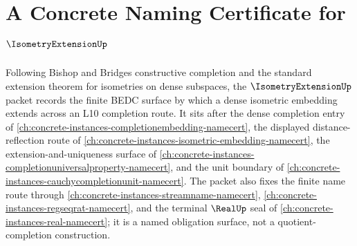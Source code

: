 \chapter{A Concrete Naming Certificate for $\IsometryExtensionUp$}
\label{ch:concrete-instances-isometryextension-namecert}

Following Bishop and Bridges constructive completion and the standard extension theorem for isometries on dense subspaces, the $\IsometryExtensionUp$ packet records the finite BEDC surface by which a dense isometric embedding extends across an L10 completion route. It sits after the dense completion entry of \autoref{ch:concrete-instances-completionembedding-namecert}, the displayed distance-reflection route of \autoref{ch:concrete-instances-isometric-embedding-namecert}, the extension-and-uniqueness surface of \autoref{ch:concrete-instances-completionuniversalproperty-namecert}, and the unit boundary of \autoref{ch:concrete-instances-cauchycompletionunit-namecert}. The packet also fixes the finite name route through \autoref{ch:concrete-instances-streamname-namecert}, \autoref{ch:concrete-instances-regseqrat-namecert}, and the terminal $\RealUp$ seal of \autoref{ch:concrete-instances-real-namecert}; it is a named obligation surface, not a quotient-completion construction.

